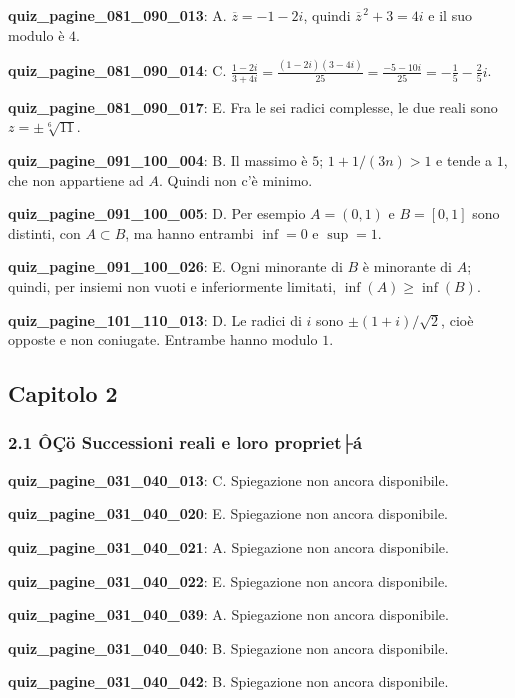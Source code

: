 \documentclass[11pt,a4paper]{article}
\newcounter{quiz}
\begin{document}
\noindent\textbf{quiz\_pagine\_081\_090\_013}: A. $\overline z=-1-2i$, quindi $\overline z^{\,2}+3=4i$ e il suo modulo è $4$.\par\medskip
\noindent\textbf{quiz\_pagine\_081\_090\_014}: C. $\frac{1-2i}{3+4i}=\frac{(1-2i)(3-4i)}{25}=\frac{-5-10i}{25}=-\frac15-\frac25i$.\par\medskip
\noindent\textbf{quiz\_pagine\_081\_090\_017}: E. Fra le sei radici complesse, le due reali sono $z=\pm\sqrt[6]{11}$.\par\medskip
\noindent\textbf{quiz\_pagine\_091\_100\_004}: B. Il massimo è $5$; $1+1/(3n)>1$ e tende a $1$, che non appartiene ad $A$. Quindi non c'è minimo.\par\medskip
\noindent\textbf{quiz\_pagine\_091\_100\_005}: D. Per esempio $A=(0,1)$ e $B=[0,1]$ sono distinti, con $A\subset B$, ma hanno entrambi $\inf=0$ e $\sup=1$.\par\medskip
\noindent\textbf{quiz\_pagine\_091\_100\_026}: E. Ogni minorante di $B$ è minorante di $A$; quindi, per insiemi non vuoti e inferiormente limitati, $\inf(A)\geq\inf(B)$.\par\medskip
\noindent\textbf{quiz\_pagine\_101\_110\_013}: D. Le radici di $i$ sono $\pm(1+i)/\sqrt2$, cioè opposte e non coniugate. Entrambe hanno modulo $1$.\par\medskip
\subsection*{Capitolo 2}
\subsubsection*{2.1 ÔÇö Successioni reali e loro propriet├á}
\noindent\textbf{quiz\_pagine\_031\_040\_013}: C. Spiegazione non ancora disponibile.\par\medskip
\noindent\textbf{quiz\_pagine\_031\_040\_020}: E. Spiegazione non ancora disponibile.\par\medskip
\noindent\textbf{quiz\_pagine\_031\_040\_021}: A. Spiegazione non ancora disponibile.\par\medskip
\noindent\textbf{quiz\_pagine\_031\_040\_022}: E. Spiegazione non ancora disponibile.\par\medskip
\noindent\textbf{quiz\_pagine\_031\_040\_039}: A. Spiegazione non ancora disponibile.\par\medskip
\noindent\textbf{quiz\_pagine\_031\_040\_040}: B. Spiegazione non ancora disponibile.\par\medskip
\noindent\textbf{quiz\_pagine\_031\_040\_042}: B. Spiegazione non ancora disponibile.\par\medskip
\end{document}
